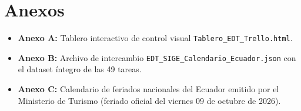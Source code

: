 \documentclass[12pt,a4paper]{article}
\begin{document}
\section{Anexos}
\begin{itemize}[leftmargin=1.5em, itemsep=2pt, topsep=2pt]
    \item \textbf{Anexo A:} Tablero interactivo de control visual \texttt{Tablero\_EDT\_Trello.html}.
    \item \textbf{Anexo B:} Archivo de intercambio \texttt{EDT\_SIGE\_Calendario\_Ecuador.json} con el dataset íntegro de las 49 tareas.
    \item \textbf{Anexo C:} Calendario de feriados nacionales del Ecuador emitido por el Ministerio de Turismo (feriado oficial del viernes 09 de octubre de 2026).
\end{itemize}
\end{document}
